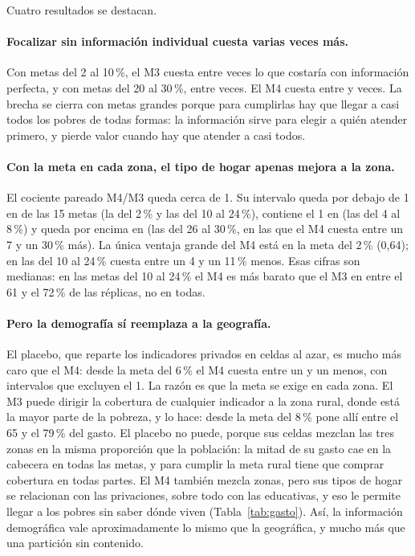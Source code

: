Cuatro resultados se destacan.

\paragraph{Focalizar sin información individual cuesta varias veces más.} Con
metas del 2 al 10\,\%, el M3 cuesta entre \zMtresIPbaja{} veces lo que costaría
con información perfecta, y con metas del 20 al 30\,\%, entre \zMtresIPalta{}
veces. El M4 cuesta entre \zMcuatroIPmin{} y \zMcuatroIPmax{} veces. La brecha se
cierra con metas grandes porque para cumplirlas hay que llegar a casi todos los
pobres de todas formas: la información sirve para elegir a quién atender
primero, y pierde valor cuando hay que atender a casi todos.

\paragraph{Con la meta en cada zona, el tipo de hogar apenas mejora a la zona.}
El cociente pareado M4/M3 queda cerca de 1. Su intervalo queda por debajo de 1
en \zMcuatroMtresMenor{} de las 15 metas (la del 2\,\% y las del 10 al
24\,\%), contiene el 1 en \zMcuatroMtresIgual{} (las del 4 al 8\,\%) y queda por
encima en \zMcuatroMtresMayor{} (las del 26 al 30\,\%, en las que el M4 cuesta
entre un 7 y un 30\,\% más). La única ventaja grande del M4 está en la meta del
2\,\% (0,64); en las del 10 al 24\,\% cuesta entre un 4 y un 11\,\% menos. Esas
cifras son medianas: en las metas del 10 al 24\,\% el M4 es más barato que el
M3 en entre el 61 y el 72\,\% de las réplicas, no en todas.

\paragraph{Pero la demografía sí reemplaza a la geografía.} El placebo, que
reparte los indicadores privados en celdas al azar, es mucho más caro que el
M4: desde la meta del 6\,\% el M4 cuesta entre un \zPlacMin{} y un \zPlacMax{}
menos, con intervalos que excluyen el 1. La razón es que la meta se exige en
cada zona. El M3 puede dirigir la cobertura de cualquier indicador a la zona
rural, donde está la mayor parte de la pobreza, y lo hace: desde la meta del
8\,\% pone allí entre el 65 y el 79\,\% del gasto. El placebo no puede, porque sus
celdas mezclan las tres zonas en la misma proporción que la población: la mitad
de su gasto cae en la cabecera en todas las metas, y para cumplir la meta rural
tiene que comprar cobertura en todas partes. El M4 también mezcla zonas, pero sus
tipos de hogar se relacionan con las privaciones, sobre todo con las educativas,
y eso le permite llegar a los pobres sin saber dónde viven
(Tabla~\ref{tab:gasto}). Así, la información demográfica vale aproximadamente lo
mismo que la geográfica, y mucho más que una partición sin contenido.

